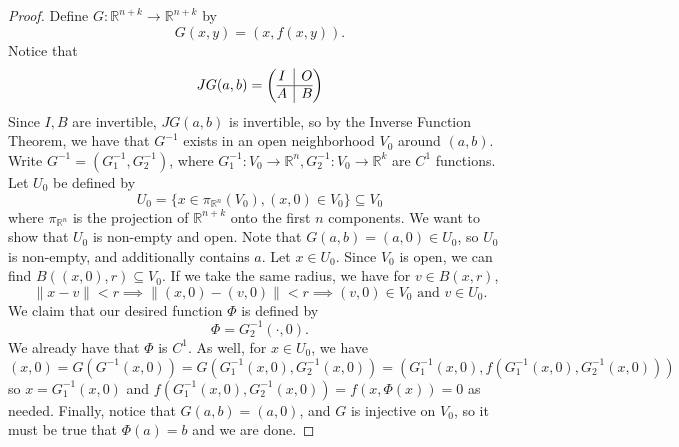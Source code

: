 \documentclass{article}
\theoremstyle{plain} %
\numberwithin{thm}{section} %
\theoremstyle{definition}
\begin{document}
    \begin{proof}
        Define \(G: \mathbb{R}^{n+k} \to \mathbb{R}^{n+k}\) by
        \[
            G(x,y) = (x, f(x,y)).
        \]
        Notice that
        \[
            JG(a,b) = \left( \begin{array}{@{}c|c@{}}
                I & O \\
                \hline
                A & B
            \end{array} \right) 
        \]
        Since \(I,B\) are invertible, \(JG(a,b)\) is invertible, so by the Inverse Function Theorem, we have that \(G^{-1}\) exists in an open neighborhood \(V_0\) around \((a,b)\). Write \(G^{-1} = (G_1^{-1}, G_2^{-1})\), where \(G_1^{-1} : V_0 \to \mathbb{R}^n, G_2^{-1} : V_0 \to \mathbb{R}^k\) are \(C^1\) functions. Let \(U_0\) be defined by
        \[
            U_0 = \{ x \in \pi_{\mathbb{R}^n} (V_0), (x,0) \in V_0 \} \subseteq V_0
        \]
        where \(\pi _{\mathbb{R}^n}\) is the projection of \(\mathbb{R}^{n+k} \) onto the first \(n\) components. We want to show that \(U_0\) is non-empty and open. Note that \(G(a,b) = (a, 0) \in U_0\), so \(U_0\) is non-empty, and additionally contains \(a\). Let \(x \in U_0\). Since \(V_0\) is open, we can find \(B((x,0), r) \subseteq V_0\). If we take the same radius, we have for \(v \in B(x, r)\),
        \[
            \|x - v\| < r \implies \|(x,0) - (v,0)\| < r \implies (v,0) \in V_0 \text{ and } v \in U_0.
        \]
        We claim that our desired function \(\Phi\) is defined by
        \[
            \Phi = G_2^{-1} (\cdot, 0).
        \]
        We already have that \(\Phi\) is \(C^1\). As well, for \(x \in U_0\), we have
        \[
            (x, 0) = G (G^{-1} (x,0)) = G(G_1^{-1} (x,0), G_2^{-1} (x,0)) = (G_1^{-1} (x,0), f(G_1^{-1} (x,0), G_2^{-1} (x,0)))
        \]
        so \(x = G_1^{-1} (x,0)\) and \(f(G_1^{-1} (x,0), G_2^{-1} (x,0)) = f(x, \Phi (x)) = 0\) as needed. Finally, notice that \(G(a,b) = (a, 0)\), and \(G\) is injective on \(V_0\), so it must be true that \(\Phi (a) = b\) and we are done.
    \end{proof}
\end{document}
